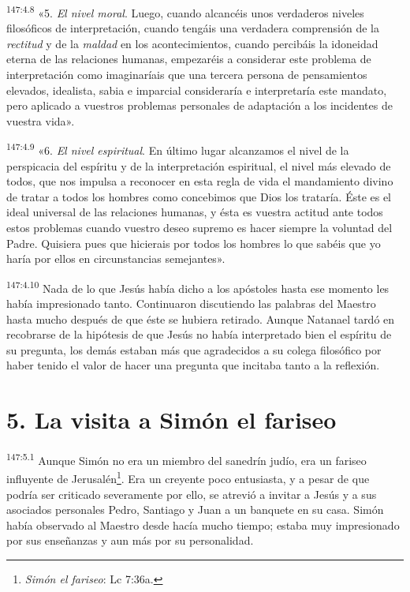 \par
\textsuperscript{147:4.8} «5. \textit{El nivel moral}. Luego, cuando alcancéis unos verdaderos niveles filosóficos de interpretación, cuando tengáis una verdadera comprensión de la \textit{rectitud} y de la \textit{maldad} en los acontecimientos, cuando percibáis la idoneidad eterna de las relaciones humanas, empezaréis a considerar este problema de interpretación como imaginaríais que una tercera persona de pensamientos elevados, idealista, sabia e imparcial consideraría e interpretaría este mandato, pero aplicado a vuestros problemas personales de adaptación a los incidentes de vuestra vida».

\par
\textsuperscript{147:4.9} «6. \textit{El nivel espiritual}. En último lugar alcanzamos el nivel de la perspicacia del espíritu y de la interpretación espiritual, el nivel más elevado de todos, que nos impulsa a reconocer en esta regla de vida el mandamiento divino de tratar a todos los hombres como concebimos que Dios los trataría. Éste es el ideal universal de las relaciones humanas, y ésta es vuestra actitud ante todos estos problemas cuando vuestro deseo supremo es hacer siempre la voluntad del Padre. Quisiera pues que hicierais por todos los hombres lo que sabéis que yo haría por ellos en circunstancias semejantes».

\par
\textsuperscript{147:4.10} Nada de lo que Jesús había dicho a los apóstoles hasta ese momento les había impresionado tanto. Continuaron discutiendo las palabras del Maestro hasta mucho después de que éste se hubiera retirado. Aunque Natanael tardó en recobrarse de la hipótesis de que Jesús no había interpretado bien el espíritu de su pregunta, los demás estaban más que agradecidos a su colega filosófico por haber tenido el valor de hacer una pregunta que incitaba tanto a la reflexión.

\section*{5. La visita a Simón el fariseo}
\par
\textsuperscript{147:5.1} Aunque Simón no era un miembro del sanedrín judío, era un fariseo influyente de Jerusalén\footnote{\textit{Simón el fariseo}: Lc 7:36a.}. Era un creyente poco entusiasta, y a pesar de que podría ser criticado severamente por ello, se atrevió a invitar a Jesús y a sus asociados personales Pedro, Santiago y Juan a un banquete en su casa. Simón había observado al Maestro desde hacía mucho tiempo; estaba muy impresionado por sus enseñanzas y aun más por su personalidad.

